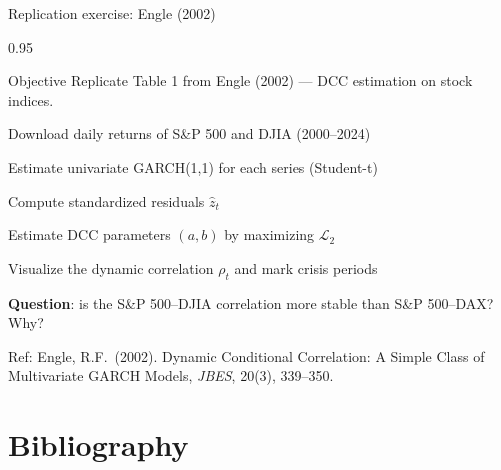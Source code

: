 \documentclass[9pt, aspectratio=169, t]{beamer}
\begin{document}
\begin{frame}{Replication exercise: Engle (2002)}
    \begin{cminipage}{0.95\textwidth}
        \begin{block}{Objective}
            Replicate Table 1 from Engle (2002) --- DCC estimation on stock indices.
        \end{block}
        \begin{enumerate}\setlength{\itemsep}{2pt}
            {\small
            \item Download daily returns of S\&P 500 and DJIA (2000--2024)
            \item Estimate univariate GARCH(1,1) for each series (Student-t)
            \item Compute standardized residuals $\hat{z}_t$
            \item Estimate DCC parameters $(a, b)$ by maximizing $\mathcal{L}_2$
            \item Visualize the dynamic correlation $\rho_t$ and mark crisis periods
            \item \textbf{Question}: is the S\&P 500--DJIA correlation more stable than S\&P 500--DAX? Why?
            }
        \end{enumerate}
        {\tiny Ref: Engle, R.F.\ (2002). Dynamic Conditional Correlation: A Simple Class of Multivariate GARCH Models, \textit{JBES}, 20(3), 339--350.}
    \end{cminipage}
\end{frame}

\section{Bibliography}
\end{document}
